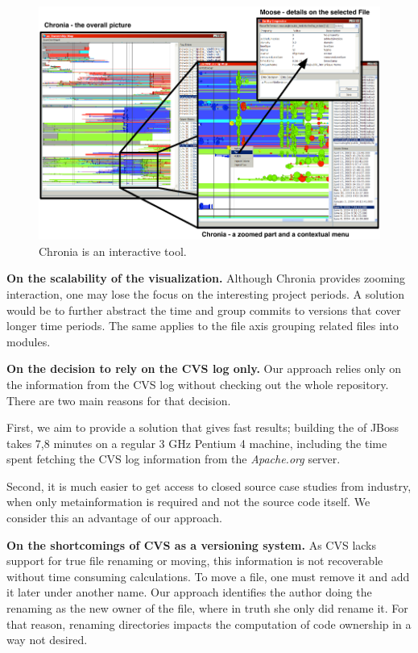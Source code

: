 \begin{figure}[htbp]
\begin{center}
\includegraphics[width=\linewidth]{fig/chronia-screenshot}
\caption{Chronia is an interactive tool.}
\label{fig:chronia}
\end{center}
\end{figure}

\textbf{On the scalability of the visualization.} Although Chronia provides zooming interaction, one may lose the focus on the interesting project periods. A solution would be to further abstract the time and group commits to versions that cover longer time periods. The same applies to the file axis grouping related files into modules.

\textbf{On the decision to rely on the CVS log only.} Our approach relies only on the information from the CVS log without checking out the whole repository. There are two main reasons for that decision.

First, we aim to provide a solution that gives fast results; \eg building the \omap of JBoss takes 7,8 minutes on a regular 3 GHz Pentium 4 machine, including the time spent fetching the CVS log information from the \textit{Apache.org} server.

Second, it is much easier to get access to closed source case studies from industry, when only metainformation is required and not the source code itself. We consider this an advantage of our approach.

\textbf{On the shortcomings of CVS as a versioning system.} As CVS lacks support for true file renaming or moving, this information is not recoverable without time consuming calculations. To move a file, one must remove it and add it later under another name. Our approach identifies the author doing the renaming as the new owner of the file, where in truth she only did rename it. For that reason, renaming directories impacts the computation of code ownership in a way not desired. 

